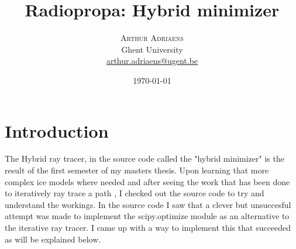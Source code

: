 \documentclass[twoside,twocolumn,11pt]{article} %
\title{Radiopropa: Hybrid minimizer} %
\author{%
\textsc{Arthur Adriaens} \\[1ex] %
\normalsize Ghent University \\ %
\normalsize \href{mailto:arthur.adriaens@ugent.be}{arthur.adriaens@ugent.be} %
}
\date{\today} %
\begin{document}
\maketitle

\section{Introduction}
The Hybrid ray tracer, in the source code called the "hybrid minimizer" is the
result of the first semester of my masters thesis. Upon learning that more
complex ice models where needed and after seeing the work that has been done to
iteratively ray trace a path \cite{2022icrc.confE1027O}, I checked out the source
code to try and understand the workings. In the source code I saw that a clever but 
unsuccesful attempt was made to implement the scipy.optimize module as an alternative
to the iterative ray tracer. I came up with a way to implement this 
that succeeded as will be explained below.
\end{document}
